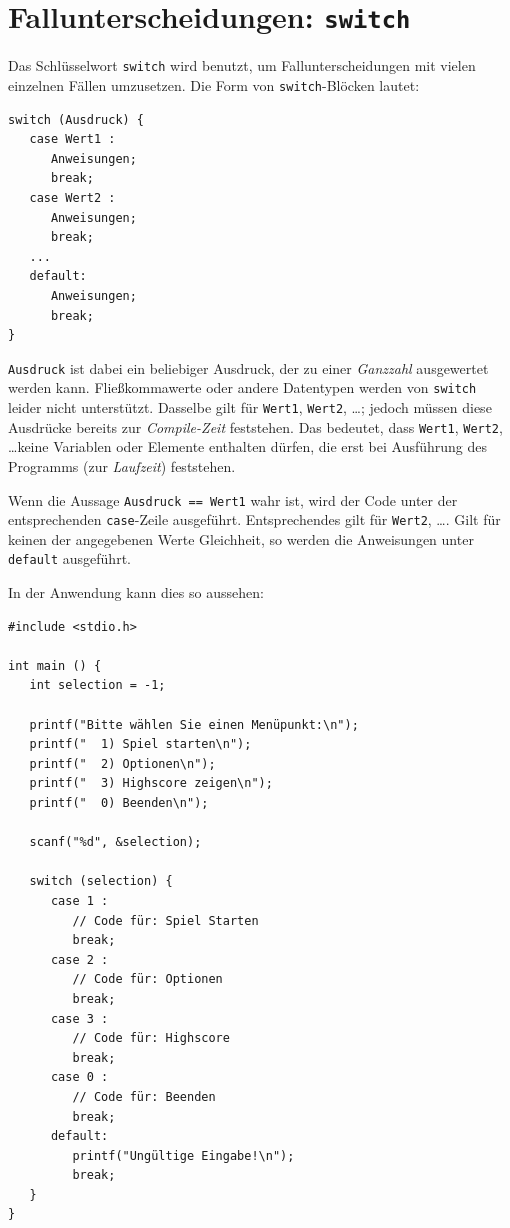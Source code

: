 \section{Fallunterscheidungen: \texttt{switch}}
Das Schlüsselwort \texttt{switch} wird benutzt, um Fallunterscheidungen mit vielen einzelnen Fällen umzusetzen. Die Form von \texttt{switch}-Blöcken lautet:

\begin{codebox}
\begin{verbatim}
switch (Ausdruck) {
   case Wert1 :
      Anweisungen;
      break;
   case Wert2 :
      Anweisungen;
      break;
   ...
   default:
      Anweisungen;
      break;
}
\end{verbatim}
\end{codebox}

\texttt{Ausdruck} ist dabei ein beliebiger Ausdruck, der zu einer \emph{Ganzzahl} ausgewertet werden kann. Fließkommawerte oder andere Datentypen werden von \texttt{switch} leider nicht unterstützt. Dasselbe gilt für \texttt{Wert1}, \texttt{Wert2}, \ldots; jedoch müssen diese Ausdrücke bereits zur \emph{Compile-Zeit} feststehen. Das bedeutet, dass \texttt{Wert1}, \texttt{Wert2}, \ldots keine Variablen oder Elemente enthalten dürfen, die erst bei Ausführung des Programms (zur \emph{Laufzeit}) feststehen.

Wenn die Aussage \texttt{Ausdruck == Wert1} wahr ist, wird der Code unter der entsprechenden \texttt{case}-Zeile ausgeführt. Entsprechendes gilt für \texttt{Wert2}, \ldots. Gilt für keinen der angegebenen Werte Gleichheit, so werden die Anweisungen unter \texttt{default} ausgeführt.

In der Anwendung kann dies so aussehen:

\begin{codebox}
\begin{verbatim}
#include <stdio.h>

int main () {
   int selection = -1;

   printf("Bitte wählen Sie einen Menüpunkt:\n");
   printf("  1) Spiel starten\n");
   printf("  2) Optionen\n");
   printf("  3) Highscore zeigen\n");
   printf("  0) Beenden\n");

   scanf("%d", &selection);

   switch (selection) {
      case 1 :
         // Code für: Spiel Starten
         break;
      case 2 :
         // Code für: Optionen
         break;
      case 3 :
         // Code für: Highscore
         break;
      case 0 :
         // Code für: Beenden
         break;
      default:
         printf("Ungültige Eingabe!\n");
         break;
   }
}
\end{verbatim}
\end{codebox}

